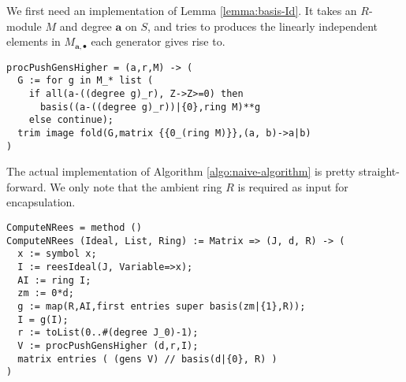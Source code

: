 \documentclass[fleqn,reqno]{amsart}
\numberwithin{first}{chapter}
\begin{document}
\begin{implementation}
We first need an implementation of Lemma \ref{lemma:basis-Id}.
It takes an $R$-module $M$ and degree $\mathbf{a}$ on $S$,
and tries to produces the linearly independent elements in $M_{\mathbf a,\bullet}$
each generator gives rise to.
\label{code:naive-algorithm}
\begin{verbatim}
procPushGensHigher = (a,r,M) -> (
  G := for g in M_* list (
    if all(a-((degree g)_r), Z->Z>=0) then
      basis((a-((degree g)_r))|{0},ring M)**g
    else continue);
  trim image fold(G,matrix {{0_(ring M)}},(a, b)->a|b)
)
\end{verbatim}
The actual implementation of Algorithm \ref{algo:naive-algorithm} is pretty straight-forward.
We only note that the ambient ring $R$ is required as input for encapsulation.
\begin{verbatim}
ComputeNRees = method ()
ComputeNRees (Ideal, List, Ring) := Matrix => (J, d, R) -> (
  x := symbol x;
  I := reesIdeal(J, Variable=>x);
  AI := ring I;
  zm := 0*d;
  g := map(R,AI,first entries super basis(zm|{1},R));
  I = g(I);
  r := toList(0..#(degree J_0)-1);
  V := procPushGensHigher (d,r,I);
  matrix entries ( (gens V) // basis(d|{0}, R) )
)
\end{verbatim}
\end{implementation}
\end{document}
